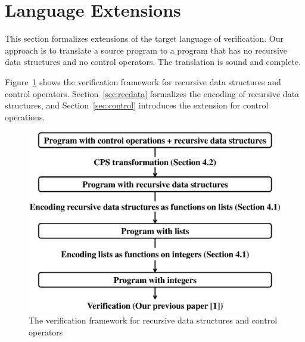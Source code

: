 \section{Language Extensions}
\label{sec:extension}

This section formalizes extensions of the target language of
verification.  Our approach is to translate a source program to a
program that has no recursive data structures and no control operators.
The translation is sound and complete.

Figure~\ref{fig:extension} shows the verification framework for recursive data structures and control
operators.
Section~\ref{sec:recdata} formalizes the encoding of recursive data
structures, and Section~\ref{sec:control} introduces the extension for
control operations.

\begin{figure}[t]
 \begin{center}
  \includegraphics[scale=0.35]{extension.eps}
 \end{center}
\caption{The verification framework for recursive data structures and control operators}
\label{fig:extension}
\end{figure}



